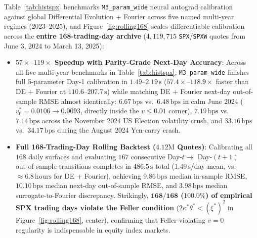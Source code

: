 \documentclass[11pt,a4paper]{article}
\begin{document}
Table~\ref{tab:histspx} benchmarks \texttt{M3\_param\_wide} neural autograd calibration against global Differential Evolution + Fourier across five named multi-year regimes (2023--2025), and Figure~\ref{fig:rolling168} scales differentiable calibration across the \textbf{entire 168-trading-day archive} ($4{,}119{,}715$ \texttt{SPX}/\texttt{SPXW} quotes from June 3, 2024 to March 13, 2025):
\begin{itemize}
  \item \textbf{$57\times\text{--}119\times$ Speedup with Parity-Grade Next-Day Accuracy}: Across all five multi-year benchmarks in Table~\ref{tab:histspx}, \texttt{M3\_param\_wide} finishes full 5-parameter Day-1 calibration in $\mathbf{1.49\text{--}2.19\,\mathrm{s}}$ ($\mathbf{57.4\times\text{--}118.9\times}$ faster than DE + Fourier at $110.6\text{--}207.7\,\mathrm{s}$) while matching DE + Fourier next-day out-of-sample RMSE almost identically: $\mathbf{6.67\,\mathrm{bps}}$ vs.\ $6.48\,\mathrm{bps}$ in calm June 2024 ($v_0^* = 0.0106 \to 0.0093$, directly inside the $v \le 0.01$ corner), $\mathbf{7.19\,\mathrm{bps}}$ vs.\ $7.14\,\mathrm{bps}$ across the November 2024 US Election volatility crush, and $\mathbf{33.16\,\mathrm{bps}}$ vs.\ $34.17\,\mathrm{bps}$ during the August 2024 Yen-carry crash.
  \item \textbf{Full 168-Trading-Day Rolling Backtest ($4.12\text{M}$ Quotes)}: Calibrating all $168$ daily surfaces and evaluating $167$ consecutive Day-$t \to$ Day-$(t+1)$ out-of-sample transitions completes in $\mathbf{486.5\,\mathrm{s}}$ total ($1.49\,\mathrm{s}$/day mean, vs.\ $\approx 6.8\,\mathrm{hours}$ for DE + Fourier), achieving $\mathbf{9.86\,\mathrm{bps}}$ median in-sample RMSE, $\mathbf{10.10\,\mathrm{bps}}$ median next-day out-of-sample RMSE, and $\mathbf{3.98\,\mathrm{bps}}$ median surrogate-to-Fourier discrepancy. Strikingly, \textbf{$\mathbf{168/168}$ ($\mathbf{100.0\%}$) of empirical SPX trading days violate the Feller condition} ($2\kappa^*\theta^* < (\xi^*)^2$ in Figure~\ref{fig:rolling168}, center), confirming that Feller-violating $v = 0$ regularity is indispensable in equity index markets.
\end{itemize}
\end{document}
